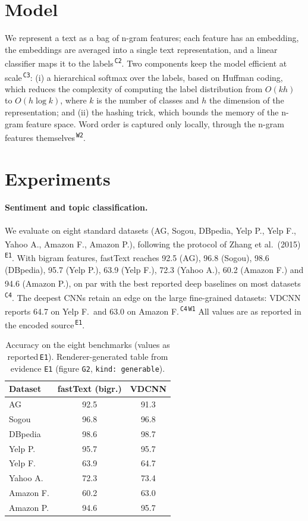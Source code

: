 \documentclass[10pt,twocolumn]{article}
\newcommand{\anch}[1]{\textsuperscript{\,\textcolor{anchor}{\tiny\texttt{#1}}}}
\begin{document}
\section{Model}
We represent a text as a bag of n-gram features; each feature has an embedding, the embeddings are averaged into a single text representation, and a linear classifier maps it to the labels\anch{C2}. Two components keep the model efficient at scale\anch{C3}: (i) a hierarchical softmax over the labels, based on Huffman coding, which reduces the complexity of computing the label distribution from $O(kh)$ to $O(h \log k)$, where $k$ is the number of classes and $h$ the dimension of the representation; and (ii) the hashing trick, which bounds the memory of the n-gram feature space. Word order is captured only locally, through the n-gram features themselves\anch{W2}.

\section{Experiments}
\paragraph{Sentiment and topic classification.}
We evaluate on eight standard datasets (AG, Sogou, DBpedia, Yelp P., Yelp F., Yahoo A., Amazon F., Amazon P.), following the protocol of Zhang et al.~(2015)\anch{E1}. With bigram features, fastText reaches 92.5 (AG), 96.8 (Sogou), 98.6 (DBpedia), 95.7 (Yelp P.), 63.9 (Yelp F.), 72.3 (Yahoo A.), 60.2 (Amazon F.) and 94.6 (Amazon P.), on par with the best reported deep baselines on most datasets\anch{C4}. The deepest CNNs retain an edge on the large fine-grained datasets: VDCNN reports 64.7 on Yelp F.\ and 63.0 on Amazon F.\anch{C4}\anch{W1} All values are as reported in the encoded source\anch{E1}.

\begin{table}[t]
\centering\small
\begin{tabular}{@{}lcc@{}}
\toprule
\textbf{Dataset} & \textbf{fastText (bigr.)} & \textbf{VDCNN} \\
\midrule
AG        & 92.5 & 91.3 \\
Sogou     & 96.8 & 96.8 \\
DBpedia   & 98.6 & 98.7 \\
Yelp P.   & 95.7 & 95.7 \\
Yelp F.   & 63.9 & 64.7 \\
Yahoo A.  & 72.3 & 73.4 \\
Amazon F. & 60.2 & 63.0 \\
Amazon P. & 94.6 & 95.7 \\
\bottomrule
\end{tabular}
\caption{Accuracy on the eight benchmarks (values as reported\,\textcolor{anchor}{\scriptsize\texttt{E1}}). Renderer-generated table from evidence \texttt{E1} (figure \texttt{G2}, \texttt{kind: generable}).}
\end{table}
\end{document}

